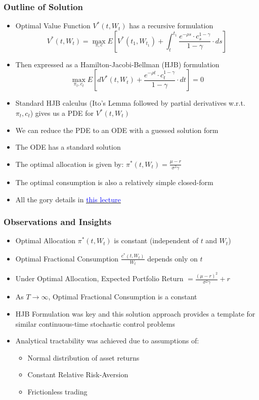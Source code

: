 \documentclass[handout]{beamer}
\begin{document}
\begin{frame}
\frametitle{Outline of Solution}
\pause
\begin{itemize}[<+->]
\item Optimal Value Function $V^*(t, W_t)$ has a recursive formulation
$$V^*(t, W_t) = \max_{\pi, c} E[V^*(t_1, W_{t_1}) + \int_t^{t_1} \frac {e^{-\rho s} \cdot c_s^{1-\gamma}} {1 - \gamma} \cdot ds]$$
\item Then expressed as a Hamilton-Jacobi-Bellman (HJB) formulation
$$\max_{\pi_t, c_t} E[dV^*(t, W_t) + \frac {e^{-\rho t} \cdot c_t^{1-\gamma}}{1 - \gamma} \cdot dt] = 0$$
\item Standard HJB calculus (Ito's Lemma followed by partial derivatives w.r.t. $\pi_t, c_t$) gives us a PDE for $V^*(t, W_t)$
\item We can reduce the PDE to an ODE with a guessed solution form
\item The ODE has a standard solution
\item The optimal allocation is given by: $\pi^*(t, W_t) = \frac {\mu - r} {\sigma^2 \gamma}$
\item The optimal consumption is also a relatively simple closed-form
\item All the gory details in \href{https://github.com/coverdrive/technical-documents/blob/master/finance/cme241/MertonPortfolio.pdf}{\underline{\textcolor{blue}{this lecture}}}
\end{itemize}
\end{frame}

\begin{frame}
\frametitle{Observations and Insights}
\pause
\begin{itemize}[<+->]
\item Optimal Allocation $\pi^*(t, W_t)$ is constant (independent of $t$ and $W_t$)
\item Optimal Fractional Consumption $\frac {c^*(t, W_t)} {W_t}$ depends only on $t$
\item Under Optimal Allocation, Expected Portfolio Return $=\frac {(\mu - r)^2} {\sigma^2 \gamma} + r$
\item As $T \rightarrow \infty$, Optimal Fractional Consumption is a constant
\item HJB Formulation was key and this solution approach provides a template for similar continuous-time stochastic control problems
\item Analytical tractability was achieved due to assumptions of:
\begin{itemize}
\item Normal distribution of asset returns
\item Constant Relative Risk-Aversion
\item Frictionless trading
\end{itemize}
\end{itemize}
\end{frame}
\end{document}
